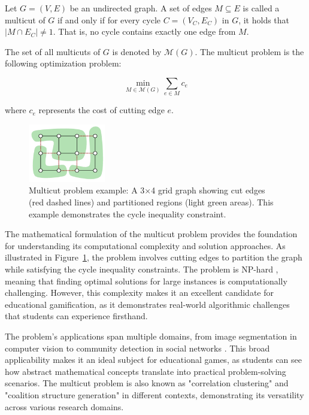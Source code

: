 \documentclass[english]{tudscrreprt}
\begin{document}
Let $G = (V, E)$ be an undirected graph. A set of edges $M \subseteq E$ is called a multicut of $G$ if and only if for every cycle $C = (V_C, E_C)$ in $G$, it holds that $|M \cap E_C| \ne 1$. That is, no cycle contains exactly one edge from $M$.

The set of all multicuts of $G$ is denoted by $\mathcal{M}(G)$. The multicut problem is the following optimization problem:

\[
\min_{M \in \mathcal{M}(G)} \sum_{e \in M} c_e
\]

where $c_e$ represents the cost of cutting edge $e$.

\begin{figure}[h]
\centering
\includegraphics[width=0.3\textwidth]{figures/multicut.png}
\caption{Multicut problem example: A 3×4 grid graph showing cut edges (red dashed lines) and partitioned regions (light green areas). This example demonstrates the cycle inequality constraint.}
\label{fig:multicut_example}
\end{figure}

The mathematical formulation of the multicut problem provides the foundation for understanding its computational complexity and solution approaches. As illustrated in Figure~\ref{fig:multicut_example}, the problem involves cutting edges to partition the graph while satisfying the cycle inequality constraints. The problem is NP-hard \cite{demaine2006}, meaning that finding optimal solutions for large instances is computationally challenging. However, this complexity makes it an excellent candidate for educational gamification, as it demonstrates real-world algorithmic challenges that students can experience firsthand.

The problem's applications span multiple domains, from image segmentation in computer vision \cite{andres2012a} to community detection in social networks \cite{charikar2005}. This broad applicability makes it an ideal subject for educational games, as students can see how abstract mathematical concepts translate into practical problem-solving scenarios. The multicut problem is also known as "correlation clustering" and "coalition structure generation" in different contexts, demonstrating its versatility across various research domains.
\end{document}
